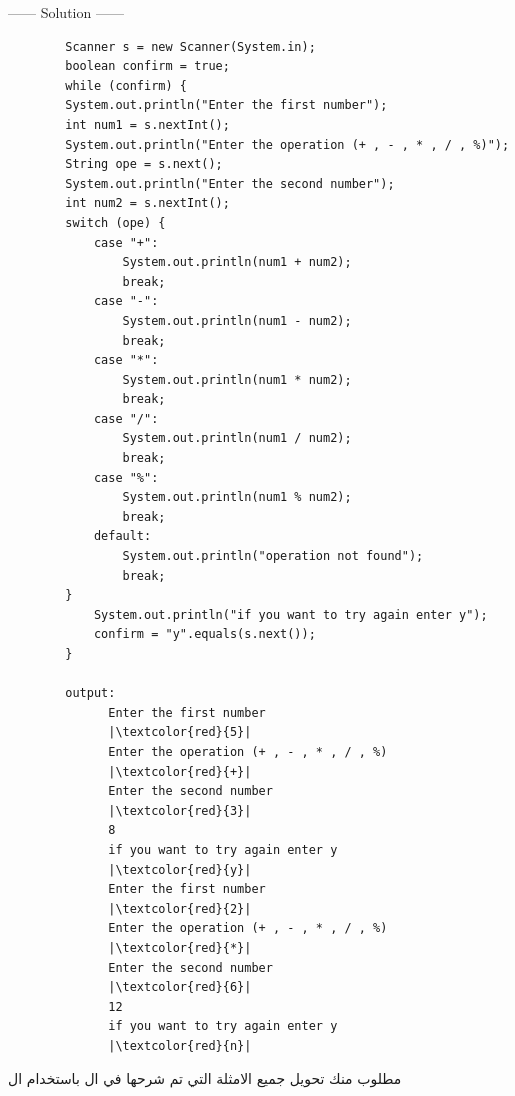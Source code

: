 \begin{example}
              
  \begin{center}
    ------ \textcolor{Solution}{Solution} ------ 
  \end{center}
  \begin{verbatim}
        Scanner s = new Scanner(System.in);
        boolean confirm = true;
        while (confirm) {            
        System.out.println("Enter the first number");
        int num1 = s.nextInt();
        System.out.println("Enter the operation (+ , - , * , / , %)");
        String ope = s.next();
        System.out.println("Enter the second number");
        int num2 = s.nextInt();
        switch (ope) {
            case "+":
                System.out.println(num1 + num2);
                break;
            case "-":
                System.out.println(num1 - num2);
                break;
            case "*":
                System.out.println(num1 * num2);
                break;
            case "/":
                System.out.println(num1 / num2);
                break;
            case "%":
                System.out.println(num1 % num2);
                break;
            default:
                System.out.println("operation not found");
                break;
        }
            System.out.println("if you want to try again enter y");
            confirm = "y".equals(s.next());
        }

        output:
              Enter the first number
              |\textcolor{red}{5}|
              Enter the operation (+ , - , * , / , %)
              |\textcolor{red}{+}|
              Enter the second number
              |\textcolor{red}{3}|
              8
              if you want to try again enter y
              |\textcolor{red}{y}|
              Enter the first number
              |\textcolor{red}{2}|
              Enter the operation (+ , - , * , / , %)
              |\textcolor{red}{*}|
              Enter the second number
              |\textcolor{red}{6}|
              12
              if you want to try again enter y
              |\textcolor{red}{n}|
  \end{verbatim}
\end{example}
\begin{task}
  \begin{AR}
    مطلوب منك تحويل جميع الامثلة التي تم شرحها في ال  باستخدام ال 
  \end{AR}
\end{task}
\newpage

